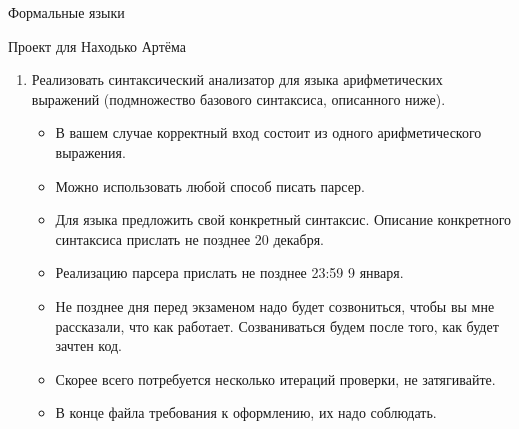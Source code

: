 \documentclass[12pt]{article}
\begin{document}
\begin{center}
{\LARGE Формальные языки}

{\Large Проект для Находько Артёма}

\end{center}

\bigskip

\begin{enumerate}
  \item {Реализовать синтаксический анализатор для языка арифметических выражений (подмножество базового синтаксиса, описанного ниже). }
  \begin{itemize}
    \item В вашем случае корректный вход состоит из одного арифметического выражения.
    \item Можно использовать любой способ писать парсер.
    \item Для языка предложить свой конкретный синтаксис. Описание конкретного синтаксиса прислать не позднее 20 декабря.
    \item Реализацию парсера прислать не позднее 23:59 9 января.
    \item Не позднее дня перед экзаменом надо будет созвониться, чтобы вы мне рассказали, что как работает. Созваниваться будем после того, как будет зачтен код.
    \item Скорее всего потребуется несколько итераций проверки, не затягивайте.
    \item В конце файла требования к оформлению, их надо соблюдать.
  \end{itemize}

\end{enumerate}
\end{document}
